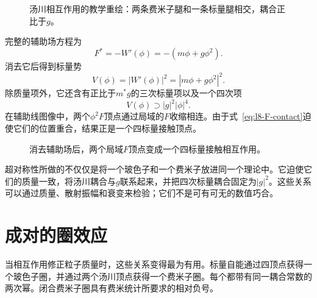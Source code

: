 \begin{figure}[H]
\centering
{}
\caption{汤川相互作用的教学重绘：两条费米子腿和一条标量腿相交，耦合正比于\(g\)。}
\end{figure}

完整的辅助场方程为
\begin{equation}
F^\ast=-W'(\phi)=-(m\phi+g\phi^2).
\label{eq:l8-general-F-equation}
\end{equation}
消去它后得到标量势
\begin{equation}
V(\phi)=|W'(\phi)|^2
=|m\phi+g\phi^2|^2.
\label{eq:l8-scalar-potential}
\end{equation}
除质量项外，它还含有正比于\(m^\ast g\)的三次标量项以及一个四次项
\begin{equation}
V(\phi)\supset |g|^2|\phi|^4.
\label{eq:l8-quartic}
\end{equation}
在辅助线图像中，两个\(\phi^2F\)顶点通过局域的\(F\)收缩相连。由于式~\eqref{eq:l8-F-contact}迫使它们的位置重合，结果正是一个四标量接触顶点。

\begin{figure}[H]
\centering
{}
\caption{消去辅助场后，两个局域\(F\)顶点变成一个四标量接触相互作用。}
\end{figure}

超对称性所做的不仅仅是将一个玻色子和一个费米子放进同一个理论中。它迫使它们的质量一致，将汤川耦合与\(g\)联系起来，并把四次标量耦合固定为\(|g|^2\)。这些关系可以通过质量、散射振幅和衰变来检验；它们不是可有可无的数值巧合。

\section{成对的圈效应}

当相互作用修正粒子质量时，这些关系变得最为有用。标量自能通过四顶点获得一个玻色子圈，并通过两个汤川顶点获得一个费米子圈。每个都带有同一耦合常数的两次幂。闭合费米子圈具有费米统计所要求的相对负号。


